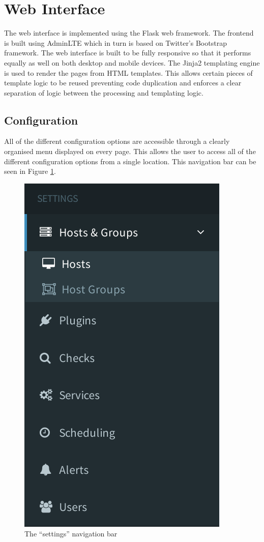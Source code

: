 \documentclass[bsc,logo,twoside,parskip,singlespacing,notimes]{infthesis}
\begin{document}
\section{Web Interface}

	The web interface is implemented using the Flask web framework.  The frontend
	is built using AdminLTE which in turn is based on Twitter's Bootstrap
	framework.  The web interface is built to be fully responsive so that it
	performs equally as well on both desktop and mobile devices.  The Jinja2
	templating engine is used to render the pages from HTML templates.  This allows
	certain pieces of template logic to be reused preventing code duplication and
	enforces a clear separation of logic between the processing and templating
	logic.


\subsection{Configuration}

	All of the different configuration options are accessible through a clearly
	organised menu displayed on every page.  This allows the user to access all of
	the different configuration options from a single location.  This navigation
	bar can be seen in Figure \ref{settings-nav}.

\begin{figure}[H]
	\centering
	\caption{The ``settings'' navigation bar}
	\label{settings-nav}
	\includegraphics[scale=0.7]{assets/screenshots/settings-nav.pdf}
\end{figure}
\end{document}
